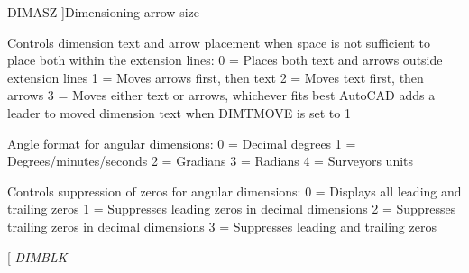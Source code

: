 \begin{Desc}
\begin{description}
{D\+I\+M\+A\+SZ\hypertarget{class_c_a_d_header_abd894aab7aa85b4c4634e67fb93d6886aec207abcb0e4d1e9d6c538a87b7c0b73}{}\label{class_c_a_d_header_abd894aab7aa85b4c4634e67fb93d6886aec207abcb0e4d1e9d6c538a87b7c0b73}
}]Dimensioning arrow size \item[{\em 
D\+I\+M\+A\+T\+F\+IT\hypertarget{class_c_a_d_header_abd894aab7aa85b4c4634e67fb93d6886ad765da78e92fe997cca7c1b2c592f580}{}\label{class_c_a_d_header_abd894aab7aa85b4c4634e67fb93d6886ad765da78e92fe997cca7c1b2c592f580}
}]Controls dimension text and arrow placement when space is not sufficient to place both within the extension lines\+: 0 = Places both text and arrows outside extension lines 1 = Moves arrows first, then text 2 = Moves text first, then arrows 3 = Moves either text or arrows, whichever fits best Auto\+C\+AD adds a leader to moved dimension text when D\+I\+M\+T\+M\+O\+VE is set to 1 \item[{\em 
D\+I\+M\+A\+U\+N\+IT\hypertarget{class_c_a_d_header_abd894aab7aa85b4c4634e67fb93d6886ab13da86ce0e3438558ee113c5dbfe4fe}{}\label{class_c_a_d_header_abd894aab7aa85b4c4634e67fb93d6886ab13da86ce0e3438558ee113c5dbfe4fe}
}]Angle format for angular dimensions\+: 0 = Decimal degrees 1 = Degrees/minutes/seconds 2 = Gradians 3 = Radians 4 = Surveyor\textquotesingle{}s units \item[{\em 
D\+I\+M\+A\+Z\+IN\hypertarget{class_c_a_d_header_abd894aab7aa85b4c4634e67fb93d6886a866553a56a8f144a0b3fbdf43c753c85}{}\label{class_c_a_d_header_abd894aab7aa85b4c4634e67fb93d6886a866553a56a8f144a0b3fbdf43c753c85}
}]Controls suppression of zeros for angular dimensions\+: 0 = Displays all leading and trailing zeros 1 = Suppresses leading zeros in decimal dimensions 2 = Suppresses trailing zeros in decimal dimensions 3 = Suppresses leading and trailing zeros \item[{\em 
D\+I\+M\+B\+LK\hypertarget{class_c_a_d_header_abd894aab7aa85b4c4634e67fb93d6886abc5664d77a2e45666c09e9862b546920}{}\label{class_c_a_d_header_abd894aab7aa85b4c4634e67fb93d6886abc5664d77a2e45666c09e9862b546920}
}
\end{description}
\end{Desc}
